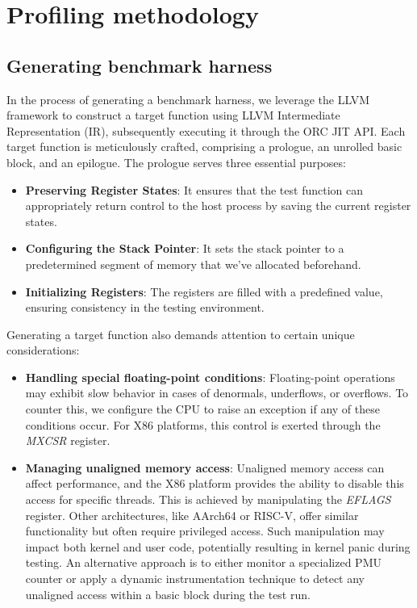 \section{Profiling methodology}

\subsection{Generating benchmark harness}

In the process of generating a benchmark harness, we leverage the LLVM framework to construct a target function using LLVM Intermediate Representation (IR), subsequently executing it through the ORC JIT API. Each target function is meticulously crafted, comprising a prologue, an unrolled basic block, and an epilogue. The prologue serves three essential purposes:

\begin{itemize}
	\item \textbf{Preserving Register States}: It ensures that the test function can appropriately return control to the host process by saving the current register states.
	\item \textbf{Configuring the Stack Pointer}: It sets the stack pointer to a predetermined segment of memory that we've allocated beforehand.
	\item \textbf{Initializing Registers}: The registers are filled with a predefined value, ensuring consistency in the testing environment.
\end{itemize}

Generating a target function also demands attention to certain unique considerations:
\begin{itemize}
	\item \textbf{Handling special floating-point conditions}: Floating-point operations may exhibit slow behavior in cases of denormals, underflows, or overflows. To counter this, we configure the CPU to raise an exception if any of these conditions occur. For X86 platforms, this control is exerted through the \textit{MXCSR} register.
	\item \textbf{Managing unaligned memory access}: Unaligned memory access can affect performance, and the X86 platform provides the ability to disable this access for specific threads. This is achieved by manipulating the \textit{EFLAGS} register. Other architectures, like AArch64 or RISC-V, offer similar functionality but often require privileged access. Such manipulation may impact both kernel and user code, potentially resulting in kernel panic during testing. An alternative approach is to either monitor a specialized PMU counter or apply a dynamic instrumentation technique to detect any unaligned access within a basic block during the test run.
\end{itemize}

